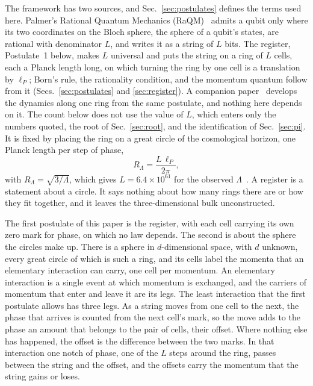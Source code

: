 \documentclass[aps,prd,twocolumn,superscriptaddress,nofootinbib]{revtex4-2}
\begin{document}
The framework has two sources, and Sec.~\ref{sec:postulates} defines the terms used here. Palmer's Rational Quantum Mechanics (RaQM)~\cite{palmer2020,palmer2026,palmer2026b,palmer2026c} admits a qubit only where its two coordinates on the Bloch sphere, the sphere of a qubit's states, are rational with denominator $L$, and writes it as a string of $L$ bits. The register, Postulate~1 below, makes $L$ universal and puts the string on a ring of $L$ cells, each a Planck length long, on which turning the ring by one cell is a translation by $\ell_P$; Born's rule, the rationality condition, and the momentum quantum follow from it (Secs.~\ref{sec:postulates} and \ref{sec:register}). A companion paper~\cite{korytko2026c} develops the dynamics along one ring from the same postulate, and nothing here depends on it. The count below does not use the value of $L$, which enters only the numbers quoted, the root of Sec.~\ref{sec:root}, and the identification of Sec.~\ref{sec:pi}. It is fixed by placing the ring on a great circle of the cosmological horizon, one Planck length per step of phase,
\begin{equation}
R_\Lambda = \frac{L\,\ell_P}{2\pi},
\label{eq:ident}
\end{equation}
with $R_\Lambda = \sqrt{3/\Lambda}$, which gives $L = 6.4\times10^{61}$ for the observed $\Lambda$~\cite{planck2018}. A register is a statement about a circle. It says nothing about how many rings there are or how they fit together, and it leaves the three-dimensional bulk unconstructed.

The first postulate of this paper is the register, with each cell carrying its own zero mark for phase, on which no law depends. The second is about the sphere the circles make up. There is a sphere in $d$-dimensional space, with $d$ unknown, every great circle of which is such a ring, and its cells label the momenta that an elementary interaction can carry, one cell per momentum. An elementary interaction is a single event at which momentum is exchanged, and the carriers of momentum that enter and leave it are its legs. The least interaction that the first postulate allows has three legs. As a string moves from one cell to the next, the phase that arrives is counted from the next cell's mark, so the move adds to the phase an amount that belongs to the pair of cells, their offset. Where nothing else has happened, the offset is the difference between the two marks. In that interaction one notch of phase, one of the $L$ steps around the ring, passes between the string and the offset, and the offsets carry the momentum that the string gains or loses.
\end{document}
